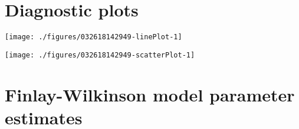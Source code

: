 \documentclass[a4paper,11pt]{article}\usepackage[]{graphicx}\usepackage[]{color}
\newenvironment{knitrout}{}{} %
\begin{document}
\clearpage
\section{Diagnostic plots}
\begin{knitrout}
\color{fgcolor}

\texttt{[image: ./figures/032618142949-linePlot-1]} \hfill{}



\end{knitrout}
\clearpage
\begin{knitrout}
\color{fgcolor}
\texttt{[image: ./figures/032618142949-scatterPlot-1]} 

\end{knitrout}
\clearpage

\section{Finlay-Wilkinson model parameter estimates}
\end{document}
